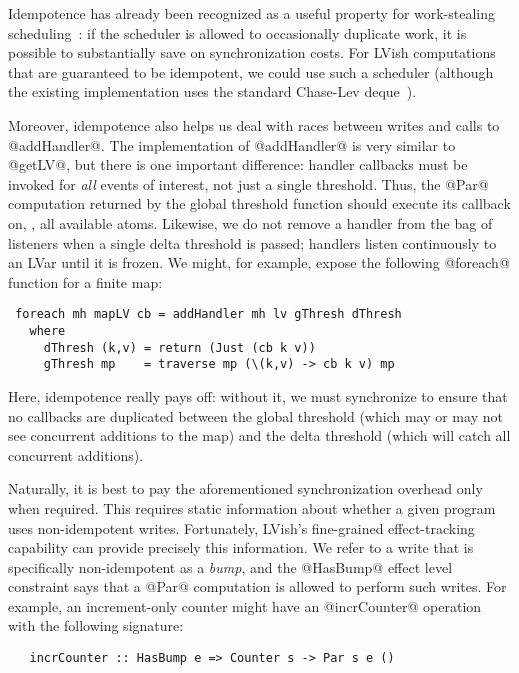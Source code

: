 Idempotence has already been recognized as a useful property for
work-stealing scheduling~\cite{idempotent}: if the scheduler is
allowed to occasionally duplicate work, it is possible to
substantially save on synchronization costs.  For LVish computations
that are guaranteed to be idempotent, we could use such a scheduler
(although the existing implementation uses the standard Chase-Lev
deque~\cite{ChaseLev}).

Moreover, idempotence also helps us deal with races between writes and
calls to @addHandler@.  The implementation of @addHandler@ is very
similar to @getLV@, but there is one important difference: handler
callbacks must be invoked for \emph{all} events of interest, not just
a single threshold.  Thus, the @Par@ computation returned by the
global threshold function should execute its callback on, \eg, all
available atoms.  Likewise, we do not remove a handler from the bag of
listeners when a single delta threshold is passed; handlers listen
continuously to an LVar until it is frozen.  We might, for example,
expose the following @foreach@ function for a finite map:

\begin{lstlisting}
 foreach mh mapLV cb = addHandler mh lv gThresh dThresh
   where
     dThresh (k,v) = return (Just (cb k v))
     gThresh mp    = traverse mp (\(k,v) -> cb k v) mp
\end{lstlisting}

Here, idempotence really pays off: without it, we must synchronize to
ensure that no callbacks are duplicated between the global threshold
(which may or may not see concurrent additions to the map) and the
delta threshold (which will catch all concurrent additions).

Naturally, it is best to pay the aforementioned synchronization
overhead only when required.  This requires static information about
whether a given program uses non-idempotent writes.  Fortunately,
LVish's fine-grained effect-tracking capability can provide precisely
this information.  We refer to a write that is specifically
non-idempotent as a \emph{bump}, and the @HasBump@ effect level
constraint says that a @Par@ computation is allowed to perform such
writes.  For example, an increment-only counter might have an
@incrCounter@ operation with the following signature:

\begin{lstlisting}
   incrCounter :: HasBump e => Counter s -> Par s e ()
\end{lstlisting}


